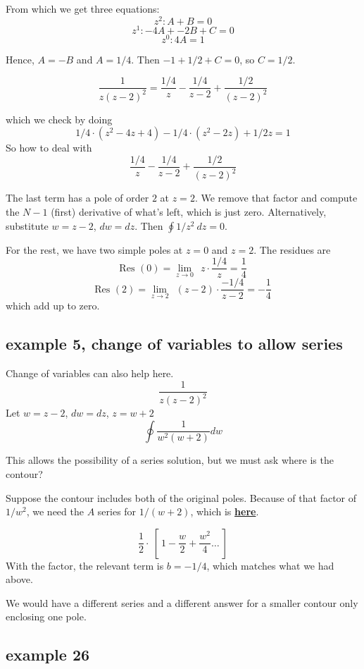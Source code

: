 \documentclass[11pt, oneside]{article}
\begin{document}
From which we get three equations:
\[ z^2:  A + B = 0 \]
\[ z^1: -4A + -2B + C = 0 \]
\[ z^0:  4A = 1 \]

Hence, $A = -B$ and $A = 1/4$. Then $-1 + 1/2 + C = 0$, so $C = 1/2$.

\[ \frac{1}{z(z-2)^2} = \frac{1/4}{z} - \frac{1/4}{z-2} +  \frac{1/2}{(z-2)^2}  \]

which we check by doing
\[ 1/4 \cdot (z^2 - 4z + 4) - 1/4 \cdot (z^2 - 2z) + 1/2 z = 1 \]
So how to deal with 
\[ \frac{1/4}{z} - \frac{1/4}{z-2} +  \frac{1/2}{(z-2)^2}  \]

The last term has a pole of order $2$ at $z = 2$.  We remove that factor and compute the $N-1$ (first) derivative of what's left, which is just zero.  Alternatively, substitute $w = z - 2$, $dw = dz$.  Then $\oint 1/z^2 \ dz = 0$.

For the rest, we have two simple poles at $z=0$ and $z=2$.  The residues are
\[ \text{Res } (0) = \lim_{z \rightarrow 0} \ \ z \cdot \frac{1/4}{z} = \frac{1}{4} \]
\[ \text{Res } (2) = \lim_{z \rightarrow 2} \ \ (z-2) \cdot \frac{-1/4}{z-2} = - \frac{1}{4} \]
which add up to zero.

\subsection*{example 5, change of variables to allow series}

Change of variables can also help here.
\[ \frac{1}{z(z-2)^2} \]
Let $w = z - 2$, $dw = dz$, $z = w + 2$
\[ \oint \frac{1}{w^2(w+2)} dw \]

This allows the possibility of a series solution, but we must ask where is the contour?

Suppose the contour includes both of the original poles.  Because of that factor of $1/w^2$, we need the $A$ series for $1/(w+2)$, which is \hyperref[sec:a_plus_z]{\textbf{here}}.

\[ \frac{1}{2} \cdot \ [ \ 1 - \frac{w}{2} + \frac{w^2}{4} \dots \ ]    \]
With the factor, the relevant term is $b = -1/4$, which matches what we had above.

We would have a different series and a different answer for a smaller contour only enclosing one pole.

\subsection*{example 26}

\label{sec:ex26R}
\end{document}
